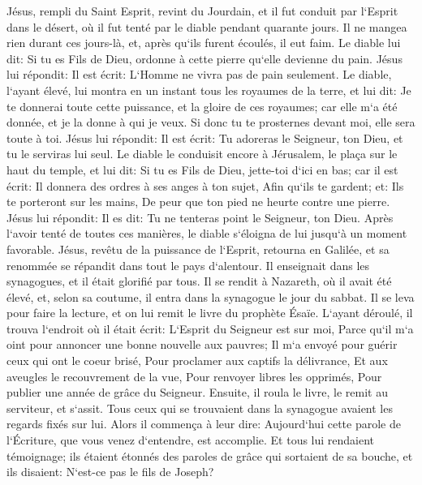 \verse Jésus, rempli du Saint Esprit, revint du Jourdain, et il fut conduit par l`Esprit dans le désert, 
\verse où il fut tenté par le diable pendant quarante jours. Il ne mangea rien durant ces jours-là, et, après qu`ils furent écoulés, il eut faim. 
\verse Le diable lui dit: Si tu es Fils de Dieu, ordonne à cette pierre qu`elle devienne du pain. 
\verse Jésus lui répondit: Il est écrit: L`Homme ne vivra pas de pain seulement. 
\verse Le diable, l`ayant élevé, lui montra en un instant tous les royaumes de la terre, 
\verse et lui dit: Je te donnerai toute cette puissance, et la gloire de ces royaumes; car elle m`a été donnée, et je la donne à qui je veux. 
\verse Si donc tu te prosternes devant moi, elle sera toute à toi. 
\verse Jésus lui répondit: Il est écrit: Tu adoreras le Seigneur, ton Dieu, et tu le serviras lui seul. 
\verse Le diable le conduisit encore à Jérusalem, le plaça sur le haut du temple, et lui dit: Si tu es Fils de Dieu, jette-toi d`ici en bas; car il est écrit: 
\verse Il donnera des ordres à ses anges à ton sujet, Afin qu`ils te gardent; 
\verse et: Ils te porteront sur les mains, De peur que ton pied ne heurte contre une pierre. 
\verse Jésus lui répondit: Il es dit: Tu ne tenteras point le Seigneur, ton Dieu. 
\verse Après l`avoir tenté de toutes ces manières, le diable s`éloigna de lui jusqu`à un moment favorable. 
\verse Jésus, revêtu de la puissance de l`Esprit, retourna en Galilée, et sa renommée se répandit dans tout le pays d`alentour. 
\verse Il enseignait dans les synagogues, et il était glorifié par tous. 
\verse Il se rendit à Nazareth, où il avait été élevé, et, selon sa coutume, il entra dans la synagogue le jour du sabbat. Il se leva pour faire la lecture, 
\verse et on lui remit le livre du prophète Ésaïe. L`ayant déroulé, il trouva l`endroit où il était écrit: 
\verse L`Esprit du Seigneur est sur moi, Parce qu`il m`a oint pour annoncer une bonne nouvelle aux pauvres; Il m`a envoyé pour guérir ceux qui ont le coeur brisé, 
\verse Pour proclamer aux captifs la délivrance, Et aux aveugles le recouvrement de la vue, Pour renvoyer libres les opprimés, Pour publier une année de grâce du Seigneur. 
\verse Ensuite, il roula le livre, le remit au serviteur, et s`assit. Tous ceux qui se trouvaient dans la synagogue avaient les regards fixés sur lui. 
\verse Alors il commença à leur dire: Aujourd`hui cette parole de l`Écriture, que vous venez d`entendre, est accomplie. 
\verse Et tous lui rendaient témoignage; ils étaient étonnés des paroles de grâce qui sortaient de sa bouche, et ils disaient: N`est-ce pas le fils de Joseph? 
